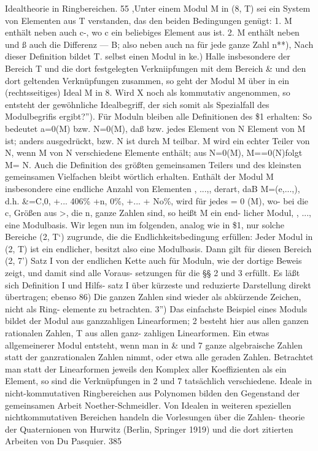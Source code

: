 \documentclass[11pt,a4paper]{article}
\theoremstyle{plain}
\theoremstyle{definition}
\begin{document}
Idealtheorie in Ringbereichen. 
55 
,Unter einem Modul M in (8, T) sei ein System von Elementen aus 
T verstanden, das den beiden Bedingungen genügt: 
1. M enthält neben \guillemotleft{} auch c-\guillemotleft{}, wo c ein beliebiges Element aus 
ist. 
2. M enthält neben \guillemotleft{} und ß auch die Differenz \guillemotleft{} --- B; also neben \guillemotleft{} auch 
na für jede ganze Zahl n**), 
Nach dieser Definition bildet 
T. selbst einen Modul in ke.) Halle 
insbesondere der Bereich T und die dort festgelegten Verkniipfungen mit 
dem Bereich \& und den dort geltenden Verknüpfungen zusammen, so geht 
der Modul M über in ein (rechtsseitiges) Ideal M in 8. 
Wird X noch 
als kommutativ angenommen, so entsteht der gewöhnliche Idealbegriff, der 
sich somit als Spezialfall des Modulbegrifis ergibt?''). 
Für Moduln bleiben alle Definitionen des \$1 erhalten: 
So bedeutet 
a=0(M) bzw. N=0(M), 
daß \guillemotleft{} bzw. jedes Element von N Element 
von M ist; anders ausgedrückt, \guillemotleft{} bzw. N ist durch M teilbar. 
M wird 
ein echter Teiler von N, wenn M von N verschiedene Elemente enthält; 
aus N=0(M), M==0(N)folgt M= N. 
Auch die Definition des größten 
gemeinsamen 
Teilers 
und des kleinsten gemeinsamen Vielfachen 
bleibt 
wörtlich 
erhalten. 
Enthält 
der Modul M insbesondere 
eine 
endliche 
Anzahl 
von 
Elementen 
\guillemotleft{}, ...\guillemotleft{},, 
derart, 
daB 
M=(\guillemotleft{}e,...\guillemotleft{},), 
d.h. 
\&=C,0, +... 406\% +n, 
0\%, +... + No\%, wird für jedes \guillemotleft{}= 0 (M), wo- 
bei die c, Größen aus >, die n, ganze Zahlen sind, so heißt M ein end- 
licher Modul, \guillemotleft{}, ...\guillemotleft{}, eine Modulbasis. 
Wir legen nun im folgenden, analog wie in \$1, nur solche Bereiche 
(2, T`) zugrunde, die die Endlichkeitsbedingung erfüllen: Jeder Modul 
in (2, T) ist ein endlicher, besitzt also eine Modulbasis. 
Dann gilt für diesen Bereich (2, 7') Satz I von der endlichen Kette 
auch für Moduln, wie der dortige Beweis zeigt, und damit sind alle Voraus- 
setzungen für die \S{}\S{} 2 und 3 erfüllt. 
Es läßt sich Definition I und Hilfs- 
satz I über kürzeste und reduzierte Darstellung direkt übertragen; ebenso 
86) Die ganzen 
Zahlen 
sind wieder als abkürzende Zeichen, 
nicht als Ring- 
elemente zu betrachten. 
3'') Das einfachste 
Beispiel eines Moduls 
bildet 
der Modul 
aus ganzzahligen 
Linearformen; 
2 besteht hier aus allen ganzen rationalen Zahlen, T aus allen ganz- 
zahligen Linearformen. 
Ein etwas allgemeinerer Modul entsteht, wenn man in \& und 7 
ganze algebraische Zahlen 
statt der ganzrationalen Zahlen nimmt, 
oder etwa alle 
geraden Zahlen. 
Betrachtet man statt der Linearformen jeweils den Komplex aller 
Koeffizienten 
als ein Element, 
so sind die Verknüpfungen in 2 und 7 tatsächlich 
verschiedene. 
Ideale in nicht-kommutativen Ringbereichen aus Polynomen bilden den 
Gegenstand der gemeinsamen 
Arbeit Noether-Schmeidler. 
Von Idealen 
in weiteren 
speziellen nichtkommutativen Bereichen handeln die Vorlesungen über die Zahlen- 
theorie der Quaternionen von Hurwitz (Berlin, Springer 1919) und die dort zitierten 
Arbeiten von Du Pasquier. 
385
\end{document}
